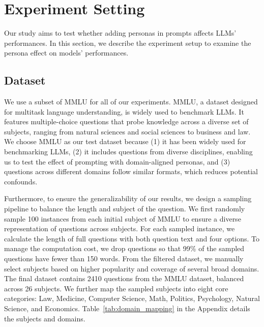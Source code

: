 \documentclass[11pt]{article}
\newcommand{\tref}[1]{Table~\ref{#1}}
\begin{document}
\section{Experiment Setting}
Our study aims to test whether adding personas in prompts affects LLMs' performances. In this section, we describe the experiment setup to examine the persona effect on models' performances.

\subsection{Dataset}
We use a subset of MMLU \cite{hendryckstest2021} for all of our experiments. MMLU, a dataset designed for multitask language understanding, is widely used to benchmark LLMs. It features multiple-choice questions that probe knowledge across a diverse set of subjects, ranging from natural sciences and social sciences to business and law. We choose MMLU as our test dataset because (1) it has been widely used for benchmarking LLMs, (2) it includes questions from diverse disciplines, enabling us to test the effect of prompting with domain-aligned personas, and (3) questions across different domains follow similar formats, which reduces potential confounds.

Furthermore, to ensure the generalizability of our results, we design a sampling pipeline to balance the length and subject of the question.  We first randomly sample 100 instances from each initial subject of MMLU to ensure a diverse representation of questions across subjects. For each sampled instance, we calculate the length of full questions with both question text and four options. To manage the computation cost, we drop questions so that 99\% of the sampled questions have fewer than 150 words. From the filtered dataset, we manually select subjects based on higher popularity and coverage of several broad domains. The final dataset contains 2410 questions from the MMLU dataset, balanced across 26 subjects. We further map the sampled subjects into eight core categories: Law, Medicine, Computer Science, Math, Politics, Psychology, Natural Science, and Economics. \tref{tab:domain_mapping} in the Appendix details the subjects and domains. 

\begin{table}[t]
    \centering
    \caption{Types and examples of prompt templates for personas used in our experiment. We further refine the prompt to meet the format requirement of each model, and the full prompts are available in the Appendix (\tref{tab:context_prompts} and \tref{tab:control_prompts}).}
    \label{tab:prompt}
\end{table}
\end{document}
